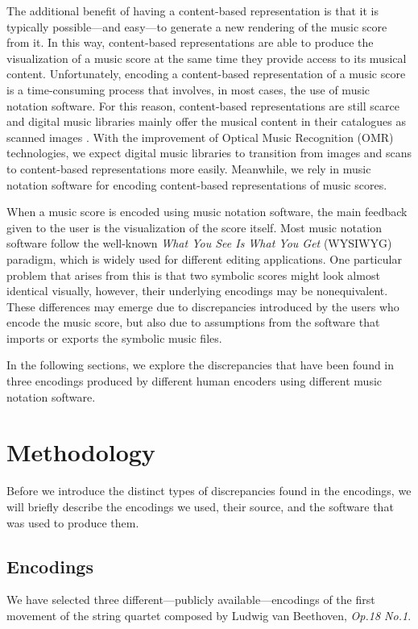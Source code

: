 The additional benefit of having a content-based representation is that it is typically possible---and easy---to generate a new rendering of the music score from it. In this way, content-based representations are able to produce the visualization of a music score at the same time they provide access to its musical content. Unfortunately, encoding a content-based representation of a music score is a time-consuming process that involves, in most cases, the use of music notation software. For this reason, content-based representations are still scarce and digital music libraries mainly offer the musical content in their catalogues as scanned images \cite{pugin2015challenge, laplante2016digitizing}. With the improvement of Optical Music Recognition (OMR) technologies, we expect digital music libraries to transition from images and scans to content-based representations more easily. Meanwhile, we rely in music notation software for encoding content-based representations of music scores.

When a music score is encoded using music notation software, the main feedback given to the user is the visualization of the score itself. Most music notation software follow the well-known \emph{What You See Is What You Get} (WYSIWYG) paradigm, which is widely used for different editing applications. One particular problem that arises from this is that two symbolic scores might look almost identical visually, however, their underlying encodings may be nonequivalent. These differences may emerge due to discrepancies introduced by the users who encode the music score, but also due to assumptions from the software that imports or exports the symbolic music files.

In the following sections, we explore the discrepancies that have been found in three encodings produced by different human encoders using different music notation software.

\section{Methodology}
Before we introduce the distinct types of discrepancies found in the encodings, we will briefly describe the encodings we used, their source, and the software that was used to produce them.

\subsection{Encodings}
We have selected three different---publicly available---encodings of the first movement of the string quartet composed by Ludwig van Beethoven, \emph{Op.18 No.1}.

